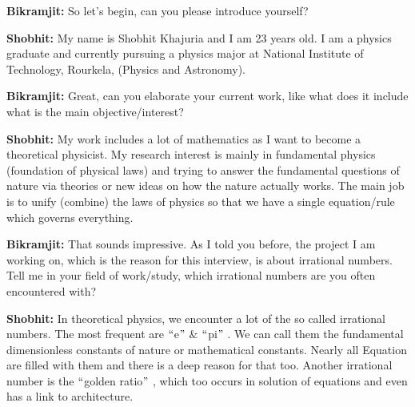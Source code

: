 \documentclass[12pt]{article}
\begin{document}
\begin{justify}
\textbf{Bikramjit: }So let’s begin, can you please introduce yourself?
\end{justify}\par

\begin{justify}
\textbf{Shobhit: }My name is Shobhit Khajuria and I am 23 years old. I am a physics graduate and currently pursuing a physics major at National Institute of Technology, Rourkela, (Physics and Astronomy).
\end{justify}\par

\begin{justify}
\textbf{Bikramjit: }Great, can you elaborate your current work, like what does it include what is the main objective/interest?
\end{justify}\par

\begin{justify}
\textbf{Shobhit: }My work includes a lot of mathematics as I want to become a theoretical physicist. My research interest is mainly in fundamental physics (foundation of physical laws) and trying to answer the fundamental questions of nature via theories or new ideas on how the nature actually works. The main job is to unify (combine) the laws of physics so that we have a single equation/rule which governs everything.
\end{justify}\par

\begin{justify}
\textbf{Bikramjit: }That sounds impressive. As I told you before, the project I am working on, which is the reason for this interview, is about irrational numbers. Tell me in your field of work/study, which irrational numbers are you often encountered with?
\end{justify}\par

\begin{justify}
\textbf{Shobhit: }In theoretical physics, we encounter a lot of the so called irrational numbers. The most frequent are $``$e$"$  $\&$  $``$pi$"$ . We can call them the fundamental dimensionless constants of nature or mathematical constants. Nearly all Equation are filled with them and there is a deep reason for that too. Another irrational number is the $``$golden ratio$"$ , which too occurs in solution of equations and even has a link to architecture.
\end{justify}\par
\end{document}
